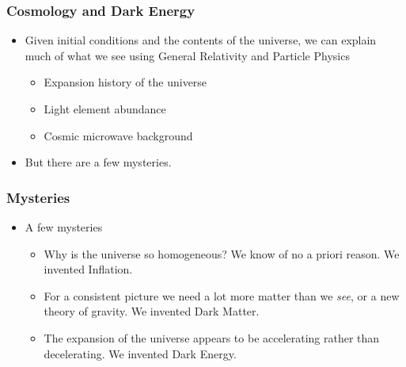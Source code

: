 \documentclass{beamer}
\begin{document}
\frame
{
    \frametitle{Cosmology and Dark Energy}


    \begin{itemize}

        \item Given initial conditions and the contents of the universe,
            we can explain much of what we see using General Relativity
            and Particle Physics

        \begin{itemize}
                
            \item Expansion history of the universe

            \item Light element abundance

            \item Cosmic microwave background

        \end{itemize}

    \item But there are a few mysteries.

    \end{itemize}
}

\frame
{
    \frametitle{Mysteries}


    \begin{itemize}

        \item A few mysteries

        \begin{itemize}
                
            \item Why is the universe so homogeneous?  We know of no a priori 
                reason.  We invented {\color{gold} Inflation}.

            \item For a consistent picture we need a lot more matter than we {\it see},
                or a new theory of gravity.  We invented {\color{gold} Dark Matter}.

            \item The expansion of the universe appears to be accelerating
                rather than decelerating.  We invented {\color{gold} Dark Energy}.

        \end{itemize}

    \end{itemize}
}
\end{document}
